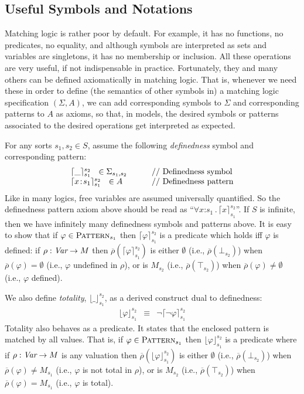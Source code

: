 \documentclass[UTF8,11pt]{article}
\theoremstyle{plain}
\theoremstyle{definition}
\theoremstyle{remark}
\newcommand{\cln}{\texttt{:}}
\newcommand{\Pattern}{\textsc{Pattern}\xspace}
\newcommand{\ra}{\rightarrow}
\begin{document}
\subsection{Useful Symbols and Notations}
\label{sec:useful}

Matching logic is rather poor by default.
For example, it has no functions, no predicates, no equality, and although
symbols are interpreted as sets and variables are singletons, it has no
membership or inclusion.
All these operations are very useful, if not indispensable in practice.
Fortunately, they and many others can be defined axiomatically in matching
logic.
That is, whenever we need these in order to define (the semantics of other
symbols in) a matching logic specification $(\Sigma,A)$, we can add
corresponding symbols to $\Sigma$ and corresponding patterns to $A$ as axioms,
so that, in models, the desired symbols or patterns associated to the
desired operations get interpreted as expected.

For any sorts $s_1,s_2\in S$, assume the following \emph{definedness}
symbol and corresponding pattern:
$$
\begin{array}{l@{\hspace*{7ex}}l}
\lceil\_\rceil_{s_1}^{s_2} \ \ \in \Sigma_{s_1,s_2}
& \textrm{// Definedness symbol} \\
\lceil x\!:\! s_1 \rceil_{s_1}^{s_2} \ \ \in A &
\textrm{// Definedness pattern}
\end{array}
$$
Like in many logics, free variables are assumed universally quantified.
So the definedness pattern axiom above should be read as
``$\forall x\cln s_1\,.\,\lceil x \rceil_{s_1}^{s_2}$''.
If $S$ is infinite, then we have infinitely many definedness symbols and patterns
above.
It is easy to show that if $\varphi \in \Pattern_{s_1}$ then
$\lceil\varphi\rceil_{s_1}^{s_2}$ is a predicate which holds iff $\varphi$ is
defined:
if $\rho : \Var \ra M$ then
$\overline{\rho}(\lceil\varphi\rceil_{s_1}^{s_2})$ is either $\emptyset$
(i.e., $\overline{\rho}(\bot_{s_2})$)
when $\overline{\rho}(\varphi) = \emptyset$
(i.e., $\varphi$ undefined in $\rho$), or is $M_{s_2}$
(i.e., $\overline{\rho}(\top_{s_2})$) 
when $\overline{\rho}(\varphi) \neq \emptyset$ (i.e., $\varphi$ defined).

We also define \emph{totality}, $\lfloor\_\rfloor_{s_1}^{s_2}$, as a derived
construct dual to definedness:
$$
\begin{array}{lcl}
\lfloor\varphi\rfloor_{s_1}^{s_2}
& \equiv &
\neg\lceil\neg\varphi\rceil_{s_1}^{s_2}
\end{array}
$$
Totality also behaves as a predicate.
It states that the enclosed pattern is matched by all values.
That is, if $\varphi \in \Pattern_{s_1}$ then $\lfloor\varphi\rfloor_{s_1}^{s_2}$
is a predicate where if $\rho : \Var \ra M$ is any valuation
then $\overline{\rho}(\lfloor\varphi\rfloor_{s_1}^{s_2})$ is either $\emptyset$
(i.e., $\overline{\rho}(\bot_{s_2})$)
when $\overline{\rho}(\varphi) \neq M_{s_1}$
(i.e., $\varphi$ is not total in $\rho$), or is $M_{s_2}$
(i.e., $\overline{\rho}(\top_{s_2})$) 
when $\overline{\rho}(\varphi) = M_{s_1}$
(i.e., $\varphi$ is total).
\end{document}
